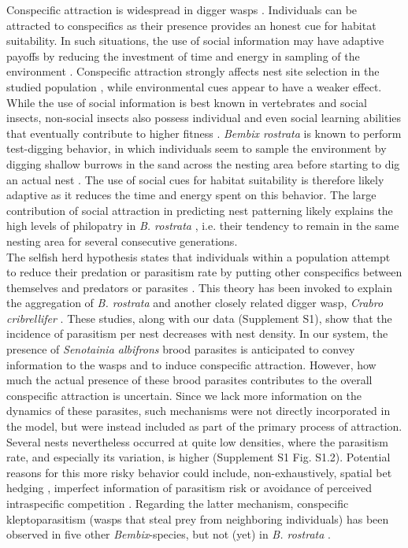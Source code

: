 \documentclass[10pt, twoside]{book} %
\begin{document}
	Conspecific attraction is widespread in digger wasps \citep{evans2007}. Individuals can be attracted to conspecifics as their presence provides an honest cue for habitat suitability. In such situations, the use of social information may have adaptive payoffs by reducing the investment of time and energy in sampling of the environment \citep{dall2005}. Conspecific attraction strongly affects nest site selection in the studied population \citep{buxton2020}, while environmental cues appear to have a weaker effect. While the use of social information is best known in vertebrates and social insects, non-social insects also possess individual and even social learning abilities that eventually contribute to higher fitness \citep{coolen2005}. \textit{Bembix rostrata} is known to perform test-digging behavior, in which individuals seem to sample the environment by digging shallow burrows in the sand across the nesting area before starting to dig an actual nest \citep{nielsen1945}. The use of social cues for habitat suitability is therefore likely adaptive as it reduces the time and energy spent on this behavior. The large contribution of social attraction in predicting nest patterning likely explains the high levels of philopatry in \textit{B. rostrata} \citep{nielsen1945, larsson1986, blosch2000}, i.e. their tendency to remain in the same nesting area for several consecutive generations.\\
	
	The selfish herd hypothesis states that individuals within a population attempt to reduce their predation or parasitism rate by putting other conspecifics between themselves and predators or parasites \citep{mooring1992}. This theory has been invoked to explain the aggregation of \textit{B. rostrata} \citep{larsson1986} and another closely related digger wasp, \textit{Crabro cribrellifer} \citep{wcislo1984}. These studies, along with our data (Supplement S1), show that the incidence of parasitism per nest decreases with nest density. In our system, the presence of \textit{Senotainia albifrons} brood parasites is anticipated to convey information to the wasps and to induce conspecific attraction. However, how much the actual presence of these brood parasites contributes to the overall conspecific attraction is uncertain. Since we lack more information on the dynamics of these parasites, such mechanisms were not directly incorporated in the model, but were instead included as part of the primary process of attraction. Several nests nevertheless occurred at quite low densities, where the parasitism rate, and especially its variation, is higher (Supplement S1 Fig. S1.2). Potential reasons for this more risky behavior could include, non-exhaustively, spatial bet hedging \citep{philippi1989}, imperfect information of parasitism risk \citep{koops1998} or avoidance of perceived intraspecific competition \citep{polidori2008}. Regarding the latter mechanism, conspecific kleptoparasitism (wasps that steal prey from neighboring individuals) has been observed in five other \textit{Bembix}-species, but not (yet) in \textit{B. rostrata} \citep{evans2007}.\\
	 
\end{document}
